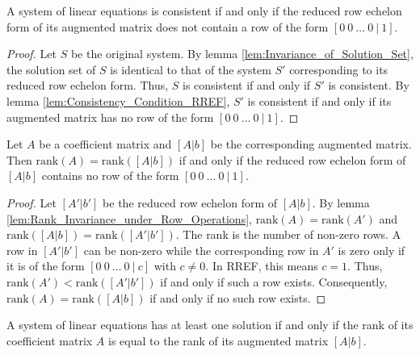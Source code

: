 \begin{lemma}
    \label{lem:System_Consistency_and_RREF}
    A system of linear equations is consistent if and only if the reduced row echelon form of its augmented matrix does not contain a row of the form $[0 \ 0 \ \dots \ 0 \ | \ 1]$.
\end{lemma}

\begin{proof}
    Let $S$ be the original system. By lemma \ref{lem:Invariance_of_Solution_Set}, the solution set of $S$ is identical to that of the system $S'$ corresponding to its reduced row echelon form. Thus, $S$ is consistent if and only if $S'$ is consistent. By lemma \ref{lem:Consistency_Condition_RREF}, $S'$ is consistent if and only if its augmented matrix has no row of the form $[0 \ 0 \ \dots \ 0 \ | \ 1]$.
\end{proof}

\begin{lemma}
    \label{lem:Rank_Equality_and_RREF}
    Let $A$ be a coefficient matrix and $[A|b]$ be the corresponding augmented matrix. Then $\text{rank}(A) = \text{rank}([A|b])$ if and only if the reduced row echelon form of $[A|b]$ contains no row of the form $[0 \ 0 \ \dots \ 0 \ | \ 1]$.
\end{lemma}

\begin{proof}
    Let $[A'|b']$ be the reduced row echelon form of $[A|b]$. By lemma \ref{lem:Rank_Invariance_under_Row_Operations}, $\text{rank}(A) = \text{rank}(A')$ and $\text{rank}([A|b]) = \text{rank}([A'|b'])$. The rank is the number of non-zero rows. A row in $[A'|b']$ can be non-zero while the corresponding row in $A'$ is zero only if it is of the form $[0 \ 0 \ \dots \ 0 \ | \ c]$ with $c \ne 0$. In RREF, this means $c=1$. Thus, $\text{rank}(A') < \text{rank}([A'|b'])$ if and only if such a row exists. Consequently, $\text{rank}(A) = \text{rank}([A|b])$ if and only if no such row exists.
\end{proof}

\begin{theorem}
    \label{thm:Rouche-Capelli_Existence}
    A system of linear equations has at least one solution if and only if the rank of its coefficient matrix $A$ is equal to the rank of its augmented matrix $[A|b]$.
\end{theorem}

